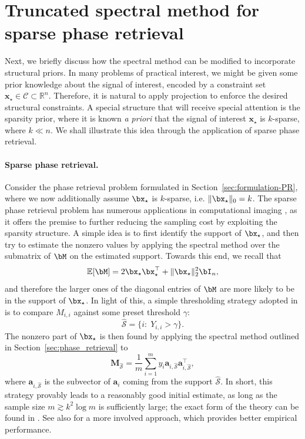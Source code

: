 
\section{Truncated spectral method for sparse phase retrieval}\label{sec:spectral_init_spr}

Next, we briefly discuss how the spectral method can be modified to incorporate structural priors. In many problems of practical interest, we might be given some prior knowledge about the signal of interest, encoded by a constraint set $\bm{x}_{\star}\in\mathcal{C}\subset \mathbb{R}^n$. Therefore, it is natural to apply projection to enforce the desired structural constraints. A special structure that will receive special attention is the sparsity prior, where it is known {\em a priori} that the signal of interest $\bm{x}_{\star} $ is $k$-sparse, where $k\ll n$. We shall illustrate this idea through the application of sparse phase retrieval.


\paragraph{Sparse phase retrieval.} Consider the phase retrieval problem formulated in Section~\ref{sec:formulation-PR}, where we now additionally assume $\bx_{\star}$ is  $k$-sparse, i.e. $\| \bx_{\star}\|_0 = k$.  The sparse phase retrieval problem has numerous applications in computational imaging \citep{soltanolkotabi2017structured,shechtman2014gespar,chen2015exact}, as it offers the premise to further reducing the sampling cost by exploiting the sparsity structure.
A simple idea is to first identify the support of $\bx_{\star}$, and then try to estimate  the nonzero values by applying the spectral method over the submatrix of $\bM$ on the estimated support. Towards this end, we recall that 
$$\mathbb{E}[\bM] = 2\bx_{\star}\bx_{\star}^{\top}+ \|\bx_{\star}\|_2^2\bI_n, $$ 
and therefore the larger ones of the diagonal entries of $\bM$ are more likely to be in the support of $\bx_{\star}$. In light of this, a simple thresholding strategy adopted in \cite{cai2016optimal} is to compare $M_{i,i}$ against some preset threshold $\gamma$:
$$ \hat{\mathcal{S}} = \{i: \; Y_{i,i}> \gamma \} .$$
The nonzero part of $\bx_{\star}$ is then found by applying the spectral method outlined in Section~\ref{sec:phase_retrieval} to 
$$\bm{M}_{\hat{\mathcal{S}}} =\frac{1}{m}\sum_{i=1}^m y_i \bm{a}_{i,\hat{\mathcal{S}}}\bm{a}_{i,\hat{\mathcal{S}}}^{\top}, $$ 
where $\bm{a}_{i,\hat{\mathcal{S}}}$ is the subvector of $\bm{a}_{i}$ coming from the support $\hat{\mathcal{S}}$. 
In short, this strategy provably leads to a reasonably good initial estimate, as long as the sample size $m \gtrsim k^2 \log m$ is sufficiently large; the exact form of the theory can be found in \cite{cai2016optimal}. 
See also \citep{wang66sparse} for a more involved approach, which provides better empirical performance.
 
